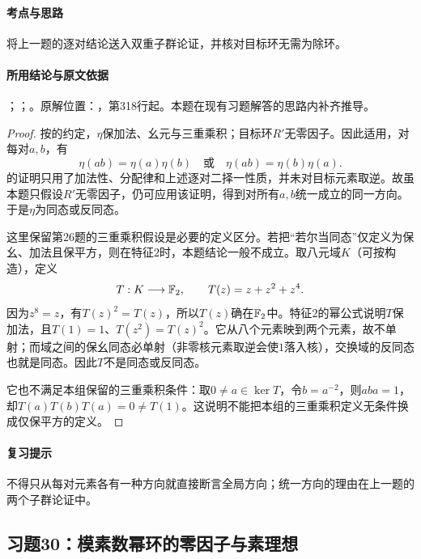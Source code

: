 \paragraph{考点与思路}

将上一题的逐对结论送入双重子群论证，并核对目标环无需为除环。

\paragraph{所用结论与原文依据}

；；。原解位置：，第318行起。本题在现有习题解答的思路内补齐推导。


\begin{proof}

按的约定，$\eta$保加法、幺元与三重乘积；目标环$R'$无零因子。因此适用，对每对$a,b$，有
\[
\eta(ab)=\eta(a)\eta(b)\quad\text{或}\quad
\eta(ab)=\eta(b)\eta(a).
\]
的证明只用了加法性、分配律和上述逐对二择一性质，并未对目标元素取逆。故虽本题只假设$R'$无零因子，仍可应用该证明，得到对所有$a,b$统一成立的同一方向。于是$\eta$为同态或反同态。

这里保留第26题的三重乘积假设是必要的定义区分。若把“若尔当同态”仅定义为保幺、加法且保平方，则在特征$2$时，本题结论一般不成立。取八元域$K$（可按构造），定义
\[
T:K\longrightarrow\mathbb F_2,\qquad T(z)=z+z^2+z^4.
\]
因为$z^8=z$，有$T(z)^2=T(z)$，所以$T(z)$确在$\mathbb F_2$中。特征$2$的幂公式说明$T$保加法，且$T(1)=1$、$T(z^2)=T(z)^2$。它从八个元素映到两个元素，故不单射；而域之间的保幺同态必单射（非零核元素取逆会使$1$落入核），交换域的反同态也就是同态。因此$T$不是同态或反同态。

它也不满足本组保留的三重乘积条件：取$0\ne a\in\ker T$，令$b=a^{-2}$，则$aba=1$，却$T(a)T(b)T(a)=0\ne T(1)$。这说明不能把本组的三重乘积定义无条件换成仅保平方的定义。

\end{proof}

\paragraph{复习提示}

不得只从每对元素各有一种方向就直接断言全局方向；统一方向的理由在上一题的两个子群论证中。



\subsection{习题30：模素数幂环的零因子与素理想}

